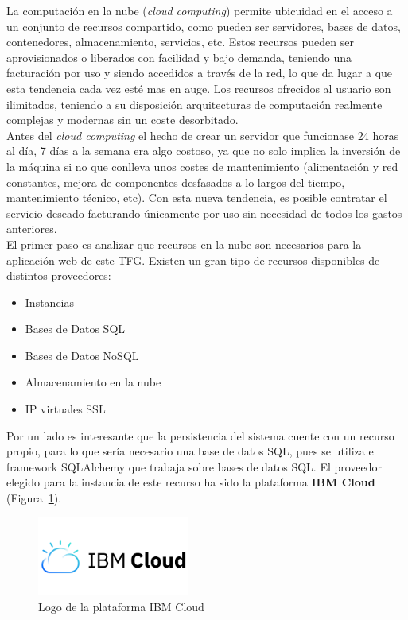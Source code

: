 La computación en la nube (\textit{cloud computing}) permite ubicuidad en el acceso a un conjunto de recursos compartido, como pueden ser servidores, bases de datos, contenedores, almacenamiento, servicios, etc. Estos recursos pueden ser aprovisionados o liberados con facilidad y bajo demanda, teniendo una facturación por uso y siendo accedidos a través de la red, lo que da lugar a que esta tendencia cada vez esté mas en auge. Los recursos ofrecidos al usuario son ilimitados, teniendo a su disposición arquitecturas de computación realmente complejas y modernas sin un coste desorbitado.\\
Antes del \textit{cloud computing} el hecho de crear un servidor que funcionase 24 horas al día, 7 días a la semana era algo costoso, ya que no solo implica la inversión de la máquina si no que conlleva unos costes de mantenimiento (alimentación y red constantes, mejora de componentes desfasados a lo largos del tiempo, mantenimiento técnico, etc). Con esta nueva tendencia, es posible contratar el servicio deseado facturando únicamente por uso sin necesidad de todos los gastos anteriores.\\

El primer paso es analizar que recursos en la nube son necesarios para la aplicación web de este \gls{TFG}. Existen un gran tipo de recursos disponibles de distintos proveedores:
\begin{itemize}
\item Instancias
\item Bases de Datos SQL
\item Bases de Datos NoSQL
\item Almacenamiento en la nube
\item IP virtuales SSL
\end{itemize}

Por un lado es interesante que la persistencia del sistema cuente con un recurso propio, para lo que sería necesario una base de datos SQL, pues se utiliza el framework SQLAlchemy que trabaja sobre bases de datos SQL. El proveedor elegido para la instancia de este recurso ha sido la plataforma \textbf{IBM Cloud}~\cite{IMB} (Figura~\ref{fig:IBMCloud}).
\begin{figure}[H]
            \centering
            \includegraphics[width=5cm]{figs/ibm_logo.png}
            \caption{Logo de la plataforma IBM Cloud}
            \label{fig:IBMCloud}
\end{figure}


